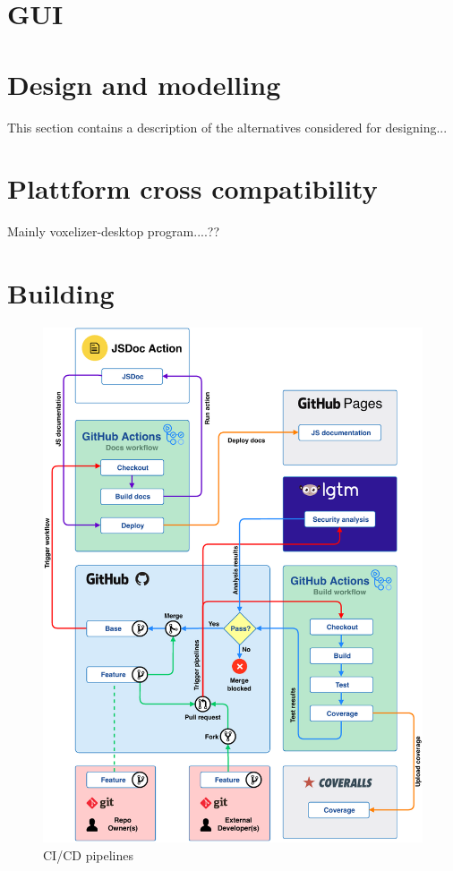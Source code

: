 \section{GUI}


\break
\section{Design and modelling}
This section contains a description of the alternatives considered for designing...


\section{Plattform cross compatibility}
Mainly voxelizer-desktop program....??

\section{Building}

\begin{figure}[h]
    \setlength{\abovecaptionskip}{25pt}
    \centering
    \includegraphics[page=1,width=\textwidth]{sections/methodology/figures/pipelines.pdf}
    \caption{CI/CD pipelines}
    \label{fig:cicd-pipelines}
\end{figure}
